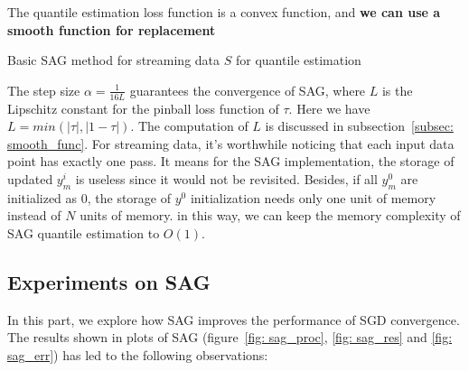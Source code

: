 The quantile estimation loss function is a convex function, and \textbf{we can use a smooth function for replacement}
\begin{algorithm}
    \caption{Basic SAG method for streaming data $S$ for quantile estimation}\label{alg:SAG}
        \begin{algorithmic}[1]
                       
                 
            \EndFor
        \end{algorithmic}
\end{algorithm}
The step size $\alpha = \frac{1}{16L}$ guarantees the convergence of SAG, where $L$ is the Lipschitz constant for the pinball loss function of $\tau$. Here we have $L = min(|\tau|, |1-\tau|)$. The computation of $L$ is discussed in subsection~\ref{subsec: smooth_func}.  For streaming data, it's worthwhile noticing that each input data point has exactly one pass. It means for the SAG implementation, the storage of updated $y_m^i$ is useless since it would not be revisited. Besides, if all $y_m^0$ are initialized as $0$, the storage of $y^0$ initialization needs only one unit of memory instead of $N$ units of memory. in this way, we can keep the memory complexity of SAG quantile estimation to $O(1)$.



\subsection{Experiments on SAG}

In this part, we explore how SAG improves the performance of SGD convergence. The results shown in plots of SAG (figure~\ref{fig: sag_proc}, \ref{fig: sag_res} and \ref{fig: sag_err}) has led to the following observations:

